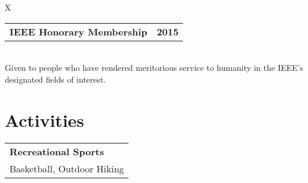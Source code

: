 \documentclass[10pt]{article}
\newcommand{\tabularxwidth}{\textwidth}
\begin{document}
            \begin{minipage}{\tabularxwidth}
            \begin{tabularx}{\tabularxwidth}{X}
                {
                    \begin{tabularx}{\tabularxwidth}{@{}X r}
                        \textbf{IEEE Honorary Membership} &
                        \textbf{
        2015} \\
                    \end{tabularx}
                } \\
                
                    
    Given to people who have rendered meritorious service to humanity in the IEEE's designated fields of interest. \\
                
            \end{tabularx}

            

            

            \end{minipage}
        
    
        
    




    
        \section{Activities}

    
        \begin{tabularx}{\tabularxwidth}{X}
            \textbf{Recreational Sports} \\
            
    
            Basketball, 
            Outdoor Hiking \\
        \end{tabularx}
\end{document}
